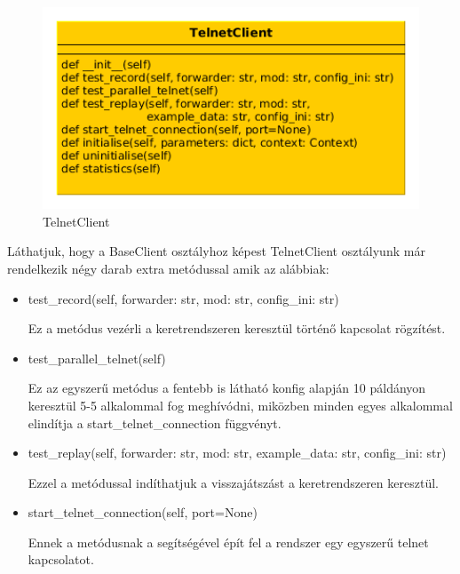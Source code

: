 \documentclass[a4paper,12pt,oneside]{report}
\begin{document}
\begin{figure}[h]
  \includegraphics[width=13cm,keepaspectratio]{telnetclient.png}
  \caption{TelnetClient}
  \label{fig:telnetclient}
\end{figure}

Láthatjuk, hogy a BaseClient osztályhoz képest TelnetClient osztályunk már rendelkezik négy darab extra metódussal amik az alábbiak:
\begin{itemize}
\itemsep0em
\item test\_record(self, forwarder: str, mod: str, config\_ini: str)

Ez a metódus vezérli a keretrendszeren keresztül történő kapcsolat rögzítést.

\item test\_parallel\_telnet(self)

Ez az egyszerű metódus a fentebb is látható konfig alapján 10 páldányon keresztül 5-5 alkalommal fog meghívódni, miközben minden egyes alkalommal elindítja a start\_telnet\_connection függvényt.

\item test\_replay(self, forwarder: str, mod: str, example\_data: str, config\_ini: str)

Ezzel a metódussal indíthatjuk a visszajátszást a keretrendszeren keresztül.

\item start\_telnet\_connection(self, port=None)

Ennek a metódusnak a segítségével épít fel a rendszer egy egyszerű telnet kapcsolatot.

\end{itemize}
\end{document}
